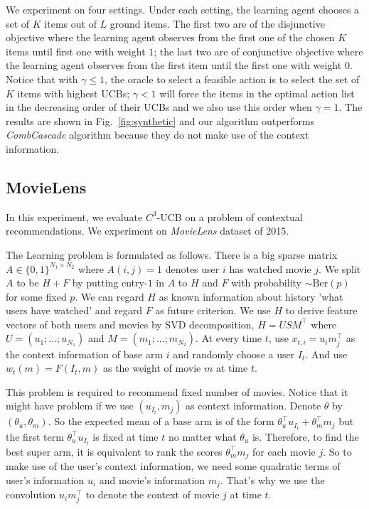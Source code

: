 \documentclass{article}
\begin{document}
We experiment on four settings. Under each setting, the learning agent chooses a set of $K$ items out of $L$ ground items. The first two are of the disjunctive objective where the learning agent observes from the first one of the chosen $K$ items until first one with weight $1$; the last two are of conjunctive objective where the learning agent observes from the first item until the first one with weight $0$. Notice that with $\gamma \leq 1$, the oracle to select a feasible action is to select the set of $K$ items with highest UCBs; $\gamma < 1$ will force the items in the optimal action list in the decreasing order of their UCBs and we also use this order when $\gamma = 1$. The results are shown in Fig.~\ref{fig:synthetic} and our algorithm outperforms {\it CombCascade} algorithm because they do not make use of the context information.


\subsection{MovieLens}

In this experiment, we evaluate $C^3$-UCB on a problem of contextual recommendations. We experiment on {\it MovieLens} dataset\cite{lam2013movie} of 2015.

The Learning problem is formulated as follows. There is a big sparse matrix $A \in \{0,1\}^{N_1 \times N_2}$ where $A(i,j) = 1$ denotes user $i$ has watched movie $j$. We split $A$ to be $H + F$ by putting entry-$1$ in $A$ to $H$ and $F$ with probability $\sim \mathrm{Ber}(p)$ for some fixed $p$. We can regard $H$ as known information about history 'what users have watched' and regard $F$ as future criterion. We use $H$ to derive feature vectors of both users and movies by SVD decomposition, $H = USM^{\top}$ where $U = (u_1; ...;u_{N_1})$ and $M = (m_1;...;m_{N_2})$. At every time $t$, use $x_{t,i} = u_{i}m_j^{\top}$ as the context information of base arm $i$ and randomly choose a user $I_t$. And use $w_t(m) = F(I_t,m)$ as the weight of movie $m$ at time $t$.

This problem is required to recommend fixed number of movies. Notice that it might have problem if we use $(u_{I_t}, m_j)$ as context information. Denote $\theta$ by $(\theta_u, \theta_m)$. So the expected mean of a base arm is of the form $\theta_u^{\top} u_{I_t} + \theta_m^{\top} m_j$ but the first term $\theta_u^{\top} u_{I_t}$ is fixed at time $t$ no matter what $\theta_u$ is. Therefore, to find the best super arm, it is equivalent to rank the scores $\theta_m^{\top} m_j$ for each movie $j$. So to make use of the user's context information, we need some quadratic terms of user's information $u_i$ and movie's information $m_j$. That's why we use the convolution $u_{i}m_j^{\top}$ to denote the context of movie $j$ at time $t$.
\end{document}
